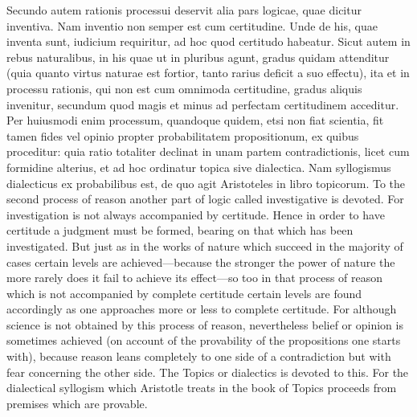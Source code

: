 Secundo autem rationis processui deservit alia pars logicae, quae dicitur inventiva. Nam inventio non semper est cum certitudine. Unde de his, quae inventa sunt, iudicium requiritur, ad hoc quod certitudo habeatur. Sicut autem in rebus naturalibus, in his quae ut in pluribus agunt, gradus quidam attenditur (quia quanto virtus naturae est fortior, tanto rarius deficit a suo effectu), ita et in processu rationis, qui non est cum omnimoda certitudine, gradus aliquis invenitur, secundum quod magis et minus ad perfectam certitudinem acceditur. Per huiusmodi enim processum, quandoque quidem, etsi non fiat scientia, fit tamen fides vel opinio propter probabilitatem propositionum, ex quibus proceditur: quia ratio totaliter declinat in unam partem contradictionis, licet cum formidine alterius, et ad hoc ordinatur topica sive dialectica. Nam syllogismus dialecticus ex probabilibus est, de quo agit Aristoteles in libro topicorum.	To the second process of reason another part of logic called investigative is devoted. For investigation is not always accompanied by certitude. Hence in order to have certitude a judgment must be formed, bearing on that which has been investigated. But just as in the works of nature which succeed in the majority of cases certain levels are achieved—because the stronger the power of nature the more rarely does it fail to achieve its effect—so too in that process of reason which is not accompanied by complete certitude certain levels are found accordingly as one approaches more or less to complete certitude. For although science is not obtained by this process of reason, nevertheless belief or opinion is sometimes achieved (on account of the provability of the propositions one starts with), because reason leans completely to one side of a contradiction but with fear concerning the other side. The Topics or dialectics is devoted to this. For the dialectical syllogism which Aristotle treats in the book of Topics proceeds from premises which are provable.
